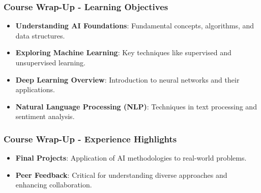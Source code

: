 \documentclass[aspectratio=169]{beamer}
\begin{document}
\begin{frame}[fragile]
    \frametitle{Course Wrap-Up - Learning Objectives}
    \begin{itemize}
        \item \textbf{Understanding AI Foundations}: Fundamental concepts, algorithms, and data structures.
        \item \textbf{Exploring Machine Learning}: Key techniques like supervised and unsupervised learning.
        \item \textbf{Deep Learning Overview}: Introduction to neural networks and their applications.
        \item \textbf{Natural Language Processing (NLP)}: Techniques in text processing and sentiment analysis.
    \end{itemize}
\end{frame}

\begin{frame}[fragile]
    \frametitle{Course Wrap-Up - Experience Highlights}
    \begin{itemize}
        \item \textbf{Final Projects}: Application of AI methodologies to real-world problems.
        \item \textbf{Peer Feedback}: Critical for understanding diverse approaches and enhancing collaboration.
    \end{itemize}
\end{frame}
\end{document}
